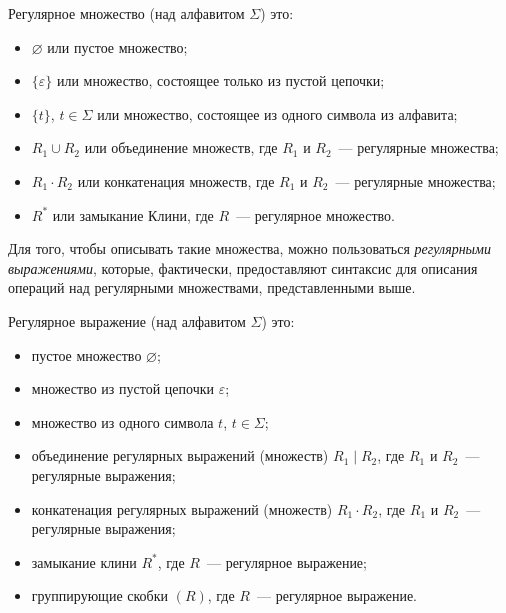 \begin{definition}
    Регулярное множество (над алфавитом $\Sigma$) это:
    \begin{itemize}
        \item $\varnothing$ или пустое множество;
        \item $\{\varepsilon\}$ или множество, состоящее только из пустой цепочки;
        \item $\{t\}$, $t \in \Sigma$ или множество, состоящее из одного символа из алфавита;
        \item $R_1 \cup R_2$ или объединение множеств, где $R_1$ и $R_2$~--- регулярные множества;
        \item $R_1 \cdot R_2$ или конкатенация множеств, где $R_1$ и $R_2$~--- регулярные множества;
        \item $R^*$ или замыкание Клини, где $R$~--- регулярное множество.
    \end{itemize}
\end{definition}

Для того, чтобы описывать такие множества, можно пользоваться \emph{регулярными выражениями}, которые, фактически, предоставляют синтаксис для описания операций над регулярными множествами, представленными выше.

\begin{definition}
    Регулярное выражение (над алфавитом $\Sigma$) это:
    \begin{itemize}
        \item пустое множество $\varnothing$;
        \item множество из пустой цепочки $\varepsilon$;
        \item множество из одного символа $t$, $t \in \Sigma$;
        \item объединение регулярных выражений (множеств) $R_1 \mid R_2$, где $R_1$ и $R_2$~--- регулярные выражения;
        \item конкатенация регулярных выражений (множеств) $R_1 \cdot R_2$, где $R_1$ и $R_2$~--- регулярные выражения;
        \item замыкание клини $R^*$, где $R$~--- регулярное выражение;
        \item группирующие скобки $(R)$, где $R$~--- регулярное выражение.
    \end{itemize}
\end{definition}

